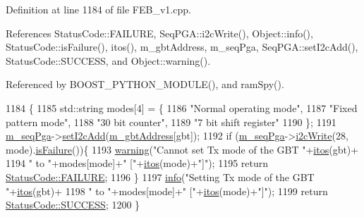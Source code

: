 Definition at line 1184 of file F\+E\+B\+\_\+v1.\+cpp.



References Status\+Code\+::\+F\+A\+I\+L\+U\+RE, Seq\+P\+G\+A\+::i2c\+Write(), Object\+::info(), Status\+Code\+::is\+Failure(), itos(), m\+\_\+gbt\+Address, m\+\_\+seq\+Pga, Seq\+P\+G\+A\+::set\+I2c\+Add(), Status\+Code\+::\+S\+U\+C\+C\+E\+SS, and Object\+::warning().



Referenced by B\+O\+O\+S\+T\+\_\+\+P\+Y\+T\+H\+O\+N\+\_\+\+M\+O\+D\+U\+L\+E(), and ram\+Spy().


\begin{DoxyCode}
1184                                                \{
1185   std::string modes[4] = \{
1186     \textcolor{stringliteral}{"Normal operating mode"},
1187     \textcolor{stringliteral}{"Fixed pattern mode"},
1188     \textcolor{stringliteral}{"30 bit counter"},
1189     \textcolor{stringliteral}{"7 bit shift register"}
1190   \};
1191   \hyperlink{classFEB__v1_a6c7804ac86796f233a8393043adf2e77}{m\_seqPga}->\hyperlink{classSeqPGA_a4ef334e4d2cb417b49033dce951728cd}{setI2cAdd}(\hyperlink{classFEB__v1_ac625855df976f16694178f1a4c0eef1e}{m\_gbtAddress}[gbt]);
1192   \textcolor{keywordflow}{if} (\hyperlink{classFEB__v1_a6c7804ac86796f233a8393043adf2e77}{m\_seqPga}->\hyperlink{classSeqPGA_a429076ca3a4ece94182bd95c623bb9d0}{i2cWrite}(28, mode).\hyperlink{classStatusCode_a5dd22dc6eb2c52fc4cabc58f6dea2eb7}{isFailure}())\{
1193     \hyperlink{classObject_a65cd4fda577711660821fd2cd5a3b4c9}{warning}(\textcolor{stringliteral}{"Cannot set Tx mode of the GBT "}+\hyperlink{Tools_8h_af330027dbdafb9a30768b3613c553e60}{itos}(gbt)+
1194      \textcolor{stringliteral}{" to "}+modes[mode]+\textcolor{stringliteral}{" ["}+\hyperlink{Tools_8h_af330027dbdafb9a30768b3613c553e60}{itos}(mode)+\textcolor{stringliteral}{"]"});
1195     \textcolor{keywordflow}{return} \hyperlink{classStatusCode_a6f565cbeadc76d14c72f047e5e85eb4ba3da73d4c469762eb9d3c960368252b26}{StatusCode::FAILURE};
1196   \}
1197   \hyperlink{classObject_a644fd329ea4cb85f54fa6846484b84a8}{info}(\textcolor{stringliteral}{"Setting Tx mode of the GBT "}+\hyperlink{Tools_8h_af330027dbdafb9a30768b3613c553e60}{itos}(gbt)+
1198        \textcolor{stringliteral}{" to "}+modes[mode]+\textcolor{stringliteral}{" ["}+\hyperlink{Tools_8h_af330027dbdafb9a30768b3613c553e60}{itos}(mode)+\textcolor{stringliteral}{"]"});
1199   \textcolor{keywordflow}{return} \hyperlink{classStatusCode_a6f565cbeadc76d14c72f047e5e85eb4badd0da38d3ba0d922efd1f4619bc37ad8}{StatusCode::SUCCESS};  
1200 \}
\end{DoxyCode}
\mbox{\label{classFEB__v1_ab7c261039c872c9f039fb7366a84d271}} 
